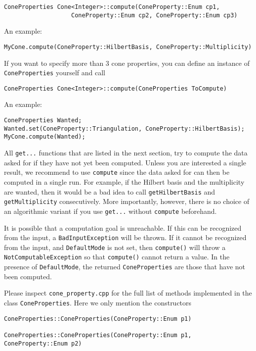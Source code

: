 \documentclass[12pt,a4paper]{scrartcl}
\theoremstyle{definition}
\begin{document}
\begin{small}
\begin{Verbatim}
ConeProperties Cone<Integer>::compute(ConeProperty::Enum cp1, 
                   ConeProperty::Enum cp2, ConeProperty::Enum cp3)
\end{Verbatim}

An example:
\begin{Verbatim}
MyCone.compute(ConeProperty::HilbertBasis, ConeProperty::Multiplicity)
\end{Verbatim}

If you want to specify more than $3$ cone properties, you can define an instance of \verb|ConeProperties| yourself and call
\begin{Verbatim}
ConeProperties Cone<Integer>::compute(ConeProperties ToCompute)
\end{Verbatim}

An example:
\begin{Verbatim}
ConeProperties Wanted;
Wanted.set(ConeProperty::Triangulation, ConeProperty::HilbertBasis);
MyCone.compute(Wanted);
\end{Verbatim}

All \verb|get...| functions that are listed in the next section, try to compute the data asked for if they have not yet been computed. Unless you are interested a single result, we recommend to use \verb|compute| since the data asked for can then be computed in a single run. For example, if the Hilbert basis and the multiplicity are wanted, then it would be a bad idea to call \verb|getHilbertBasis| and \verb|getMultiplicity| consecutively. More importantly, however, there is no choice of an algorithmic variant if you use \verb|get...| without \verb|compute| beforehand.

It is possible that a computation goal is unreachable. If this can be recognized from the input, a \verb|BadInputException| will be thrown. If it cannot be recognized from the input, and \verb|DefaultMode| is not set, then \verb|compute()| will throw a \verb|NotComputableException| so that \verb|compute()| cannot return a value. In the presence of \verb|DefaultMode|, the returned \verb|ConeProperties| are those that have not been computed.

Please inspect \verb|cone_property.cpp| for the full list of methods implemented in the class \verb|ConeProperties|. Here we only mention the constructors
\begin{Verbatim}
ConeProperties::ConeProperties(ConeProperty::Enum p1)

ConeProperties::ConeProperties(ConeProperty::Enum p1, ConeProperty::Enum p2)


\end{Verbatim}
\end{small}
\end{document}
